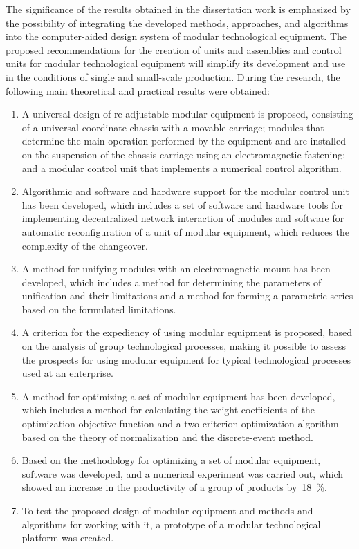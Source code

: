 
The significance of the results obtained in the dissertation work is emphasized by the possibility of integrating the developed methods, approaches, and algorithms into the computer-aided design system of modular technological equipment. The proposed recommendations for the creation of units and assemblies and control units for modular technological equipment will simplify its development and use in the conditions of single and small-scale production. During the research, the following main theoretical and practical results were obtained:

\begin{enumerate}
\item A universal design of re-adjustable modular equipment is proposed, consisting of a universal coordinate chassis with a movable carriage; modules that determine the main operation performed by the equipment and are installed on the suspension of the chassis carriage using an electromagnetic fastening; and a modular control unit that implements a numerical control algorithm.
\item Algorithmic and software and hardware support for the modular control unit has been developed, which includes a set of software and hardware tools for implementing decentralized network interaction of modules and software for automatic reconfiguration of a unit of modular equipment, which reduces the complexity of the changeover.
\item A method for unifying modules with an electromagnetic mount has been developed, which includes a method for determining the parameters of unification and their limitations and a method for forming a parametric series based on the formulated limitations.
\item A criterion for the expediency of using modular equipment is proposed, based on the analysis of group technological processes, making it possible to assess the prospects for using modular equipment for typical technological processes used at an enterprise.
\item A method for optimizing a set of modular equipment has been developed, which includes a method for calculating the weight coefficients of the optimization objective function and a two-criterion optimization algorithm based on the theory of normalization and the discrete-event method.
\item Based on the methodology for optimizing a set of modular equipment, software was developed, and a numerical experiment was carried out, which showed an increase in the productivity of a group of products by~\SI{18}{\percent}.
\item To test the proposed design of modular equipment and methods and algorithms for working with it, a prototype of a modular technological platform was created.
\end{enumerate}


